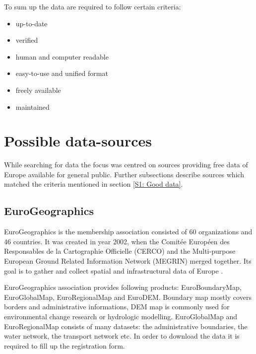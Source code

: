 \documentclass[thesis=M,english]{FITthesis}[2012/10/20]
\begin{document}
To sum up the data are required to follow certain criteria:
\begin{itemize}
	\item up-to-date
	\item verified
	\item human and computer readable
	\item easy-to-use and unified format
	\item freely available
	\item maintained
\end{itemize}



\section{Possible data-sources}

While searching for data the focus was centred on sources providing free data of Europe available for general public. Further subsections describe sources which matched the criteria mentioned in section \ref{S1: Good data}.

 
\subsection{EuroGeographics}
EuroGeographics is the membership association consisted of 60 organizations and 46 countries. It was created in year 2002, when the Comit{\' e}e Europ{\' e}en des Responsables de la Cartographie Officielle (CERCO) and the Multi-purpose European Ground Related Information Network (MEGRIN) merged together. Its goal is to gather and collect spatial and infrastructural data of Europe \cite{Euro16}. 

EuroGeographics association provides following products: EuroBoundaryMap, EuroGlobalMap, EuroRegionalMap and EuroDEM.
Boundary map mostly covers borders and administrative informations, DEM map is commonly used for environmental change research or hydrologic modelling.
EuroGlobalMap and EuroRegionalMap consists of many datasets: the administrative boundaries, the water network, the transport network etc. 
In order to download the data it is required to fill up the registration form.
\end{document}
